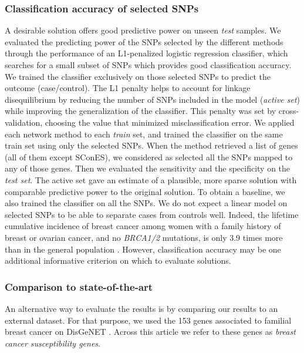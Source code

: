 \documentclass[10pt,letterpaper]{article}
\begin{document}
\subsubsection{Classification accuracy of selected SNPs}
\label{methods:classifier}

A desirable solution offers good predictive power on unseen \emph{test} samples. We evaluated the predicting power of the SNPs selected by the different methods through the performance of an L1-penalized logistic regression classifier, which searches for a small subset of SNPs which provides good classification accuracy. We trained the classifier exclusively on those selected SNPs to predict the outcome (case/control). The L1 penalty helps to account for linkage disequilibrium by reducing the number of SNPs included in the model (\emph{active set}) while improving the generalization of the classifier. This penalty was set by cross-validation, choosing the value that minimized misclassification error. We applied each network method to each \emph{train} set, and trained the classifier on the same train set using only the selected SNPs. When the method retrieved a list of genes (all of them except SConES), we considered as selected all the SNPs mapped to any of those genes. Then we evaluated the sensitivity and the specificity on the \emph{test set}. The active set gave an estimate of a plausible, more sparse solution with comparable predictive power to the original solution. To obtain a baseline, we also trained the classifier on all the SNPs. We do not expect a linear model on selected SNPs to be able to separate cases from controls well. Indeed, the lifetime cumulative incidence of breast cancer among women with a family history of breast or ovarian cancer, and no \emph{BRCA1/2} mutations, is only 3.9 times more than in the general population \cite{Metcalfe2008}. However, classification accuracy may be one additional informative criterion on which to evaluate solutions.

\subsubsection{Comparison to state-of-the-art}
\label{methods:bcac}

An alternative way to evaluate the results is by comparing our results to an external dataset. For that purpose, we used the 153 genes associated to familial breast cancer on DisGeNET \cite{pinero_disgenet:_2017}. Across this article we refer to these genes as \emph{breast cancer susceptibility genes}.
\end{document}
